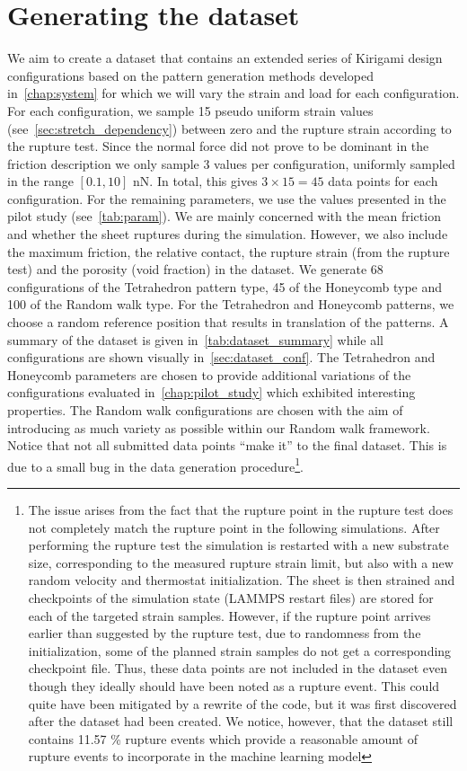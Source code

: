 \section{Generating the dataset}
We aim to create a dataset that contains an extended series of Kirigami design configurations based on the pattern generation methods developed in~\cref{chap:system} for which we will vary the strain and load for each configuration. For each configuration, we sample 15 pseudo uniform strain values (see~\cref{sec:stretch_dependency}) between zero and the rupture strain according to the rupture test. Since the normal force did not prove to be dominant in the friction description we only sample 3 values per configuration, uniformly sampled in the range $[0.1, 10]$ nN. In total, this gives $3\times 15 = 45$ data points for each configuration. For the remaining parameters, we use the
values presented in the pilot study (see~\cref{tab:param}). We are mainly
concerned with the mean friction and whether the sheet ruptures during the simulation. However, we also include the maximum friction, the relative contact, the rupture strain (from the rupture test) and the porosity (void fraction) in the dataset. We generate 68 configurations of the Tetrahedron pattern type, 45 of the Honeycomb type and 100 of the Random walk type. For the Tetrahedron and Honeycomb patterns, we choose a random reference position that results in translation of the patterns. A summary of the dataset is given in~\cref{tab:dataset_summary} while all configurations are shown visually in~\cref{sec:dataset_conf}. The Tetrahedron and Honeycomb parameters are chosen to
provide additional variations of the configurations evaluated in~\cref{chap:pilot_study} which exhibited interesting properties. The Random
walk configurations are chosen with the aim of introducing as much variety as possible within our Random walk framework. Notice that not all submitted data points ``make it'' to the final dataset. This
is due to a small bug in the data generation procedure\footnote{The issue arises from the fact that the rupture point in the rupture test does not
completely match the rupture point in the following simulations. After
performing the rupture test the simulation is restarted with a new substrate
size, corresponding to the measured rupture strain limit, but also with a new
random velocity and thermostat initialization. The sheet is then strained and
checkpoints of the simulation state (LAMMPS restart files) are stored for each of
the targeted strain samples. However, if the rupture point arrives earlier than suggested by the rupture test, due to randomness from the initialization, some of the planned strain samples do not get a corresponding checkpoint file. Thus, these data points are not included in the dataset even though they ideally should have been noted as a rupture event. This could quite have been mitigated by a rewrite of the code, but it was first discovered after the dataset had been created. We notice, however, that the dataset still contains 11.57 \% rupture events which provide a reasonable amount of rupture events to incorporate in the machine learning model}.


